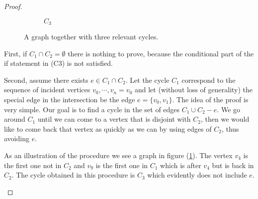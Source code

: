 \begin{proof}
\begin{enumerate}
\begin{figure}[h]
\begin{subfigure}[h]{0.245\textwidth}
\end{subfigure}
\begin{subfigure}[h]{0.245\textwidth}
  \caption{$C _3$} 
\end{subfigure}

\caption{A graph together with three relevant cycles.}
\label{impostor2}
    \end{figure}

    First, if $C_1 \cap C_2 = \emptyset$ there is nothing to prove, because the conditional part of the if statement in (C3) is not satisfied.
   
   Second, assume there exists $e \in C_1 \cap C_2$. Let the cycle $C_1$ correspond to the sequence of incident vertices  $v_0, \cdots, v_n = v_0$ and let (without loss of generality) the special edge in the intersection be the edge $e = \{v_0, v_1\}$. The idea of the proof is very simple. Our goal is to find a cycle in the set of edges $C_1 \cup C_2 -e$. We go around $C_1$ until we can come to a vertex that is disjoint with $C_2$, then we would like to come back that vertex as quickly as we can by using edges of $C_2$, thus avoiding $e.$

   As an illustration of the procedure we see a graph in figure (\ref{impostor2}). The vertex $v_4$ is the first one not in $C_2$ and $v_9$ is the first one in $C_1$ which is after $v_4$ but is back in $C_2$. The cycle obtained in this procedure is $C_3$ which evidently does not include $e.$



\end{enumerate}
\end{proof}

